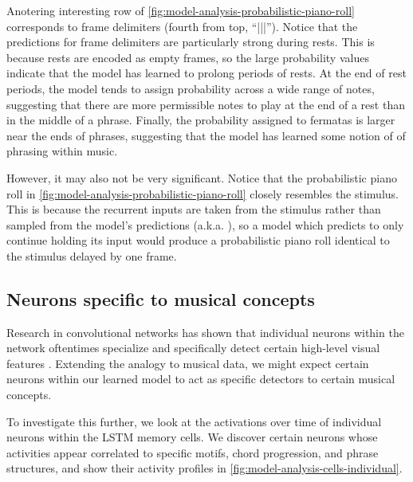 Anotering interesting row of \cref{fig:model-analysis-probabilistic-piano-roll}
corresponds to frame delimiters (fourth from top, ``|||''). Notice that the
predictions for frame delimiters are particularly strong during rests. This is
because rests are encoded as empty frames, so the large probability values
indicate that the model has learned to prolong periods of rests. At the end of
rest periods, the model tends to assign probability across a wide range of
notes, suggesting that there are more permissible notes to play at the end of a
rest than in the middle of a phrase. Finally, the probability assigned to
fermatas is larger near the ends of phrases, suggesting that the model has
learned some notion of of phrasing within music.

However, it may also not be very significant. Notice that the probabilistic
piano roll in \cref{fig:model-analysis-probabilistic-piano-roll} closely
resembles the stimulus. This is because the recurrent inputs are taken from the
stimulus rather than sampled from the model's predictions (a.k.a.
\citep{williams1989learning}), so a model which predicts to only continue
holding its input would produce a probabilistic piano roll identical to the
stimulus delayed by one frame.

\subsection{Neurons specific to musical concepts}\label{sec:music-concept-neurons}

Research in convolutional networks has shown that individual neurons within the
network oftentimes specialize and specifically detect certain high-level visual
features \citep{zeiler2010deconvolutional}. Extending the analogy to musical
data, we might expect certain neurons within our learned model to act as
specific detectors to certain musical concepts.

To investigate this further, we look at the activations over time of individual
neurons within the LSTM memory cells. We discover certain neurons whose
activities appear correlated to specific motifs, chord progression, and phrase
structures, and show their activity profiles in
\cref{fig:model-analysis-cells-individual}.

